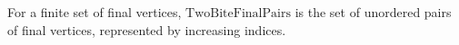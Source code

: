 \begin{definition}
For a finite set of final vertices, \(\mathrm{TwoBiteFinalPairs}\) is the set
of unordered pairs of final vertices, represented by increasing indices.
\end{definition}
